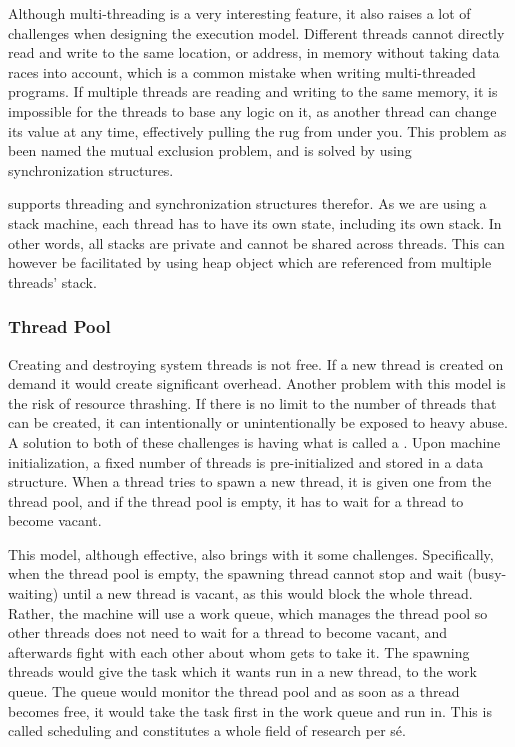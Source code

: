 Although multi-threading is a very interesting feature, it also raises a lot of
challenges when designing the execution model. Different threads cannot directly
read and write to the same location, or address, in memory without taking data
races into account, which is a common mistake when writing multi-threaded
programs. If multiple threads are reading and writing to the same memory, it is
impossible for the threads to base any logic on it, as another thread can change
its value at any time, effectively pulling the rug from under you. This problem
as been named the mutual exclusion problem, and is solved by using
synchronization structures.

\thename{} supports threading and synchronization structures therefor. As we are
using a stack machine, each thread has to have its own state, including its own
stack. In other words, all stacks are private and cannot be shared across
threads. This can however be facilitated by using heap object which are
referenced from multiple threads' stack.

\subsubsection{Thread Pool}

Creating and destroying system threads is not free. If a new thread is created
on demand it would create significant overhead. Another problem with this model
is the risk of resource thrashing. If there is no limit to the number of threads
that can be created, it can intentionally or unintentionally be exposed to heavy
abuse. A solution to both of these challenges is having what is called a
. Upon machine initialization, a fixed number of threads is
pre-initialized and stored in a data structure. When a thread tries to spawn a
new thread, it is given one from the thread pool, and if the thread pool is
empty, it has to wait for a thread to become vacant.

This model, although effective, also brings with it some
challenges. Specifically, when the thread pool is empty, the spawning thread
cannot stop and wait (busy-waiting) until a new thread is vacant, as this would
block the whole thread. Rather, the machine will use a work queue, which manages
the thread pool so other threads does not need to wait for a thread to become
vacant, and afterwards fight with each other about whom gets to take it. The
spawning threads would give the task which it wants run in a new thread, to the
work queue. The queue would monitor the thread pool and as soon as a thread
becomes free, it would take the task first in the work queue and run in. This is
called scheduling and constitutes a whole field of research per s\'e.

